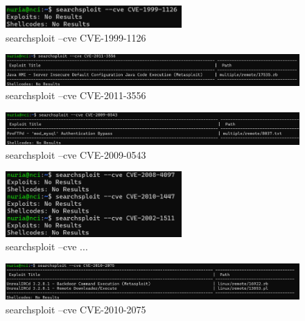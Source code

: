\documentclass[a4paper,12pt]{article} %
\begin{document}
            \begin{figure} [hp!]
             \centering
             \includegraphics[width=0.6\textwidth]{imagenes/cvelinux27.png}
             \caption{ searchsploit --cve CVE-1999-1126}
             \label{fig:linux27}
            \end{figure}

            \begin{figure} [hp!]
             \centering
             \includegraphics[width=1\textwidth]{imagenes/cvelinux28.png}
             \caption{ searchsploit --cve CVE-2011-3556}
             \label{fig:linux28}
            \end{figure}

\newpage
            \begin{figure} [hp!]
             \centering
             \includegraphics[width=1\textwidth]{imagenes/cvelinux29.png}
             \caption{ searchsploit --cve CVE-2009-0543}
             \label{fig:linux29}
            \end{figure}

            \begin{figure} [hp!]
             \centering
             \includegraphics[width=0.6\textwidth]{imagenes/cvelinux30.png}
             \caption{ searchsploit --cve ...}
             \label{fig:linux30}
            \end{figure}


            \begin{figure} [hp!]
             \centering
             \includegraphics[width=1\textwidth]{imagenes/cvelinux31.png}
             \caption{ searchsploit --cve CVE-2010-2075}
             \label{fig:linux31}
            \end{figure}
\end{document}

